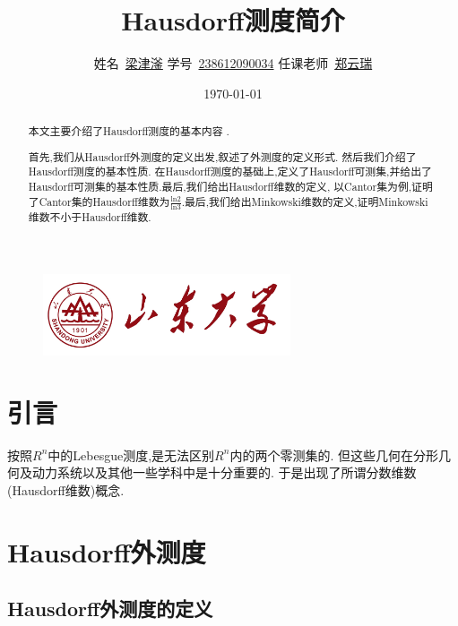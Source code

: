 \documentclass[hyperref,a4paper,UTF8]{ctexart}
\title{\textbf{{Hausdorff测度简介}}}
\author{
\kaishu\normalsize
姓名\ \underline{梁津滏} \qquad
学号\ \underline{238612090034} \qquad
任课老师\ \underline{郑云瑞}
}
\date{\today} %
\begin{document}
\begin{figure}
    \centering
    \includegraphics[width=0.65\textwidth]{figure/SDU.jpg}
\end{figure}

\maketitle

\begin{abstract}

本文主要介绍了Hausdorff测度的基本内容 . 

首先,我们从Hausdorff外测度的定义出发,叙述了外测度的定义形式. 然后我们介绍了Hausdorff测度的基本性质. 在Hausdorff测度的基础上,定义了Hausdorff可测集,并给出了Hausdorff可测集的基本性质.最后,我们给出Hausdorff维数的定义, 以Cantor集为例,证明了Cantor集的Hausdorff维数为$\frac{\mathrm{ln}2}{\mathrm{ln}3}$.最后,我们给出Minkowski维数的定义,证明Minkowski维数不小于Hausdorff维数.

\end{abstract}

\thispagestyle{empty} %
\newpage

\tableofcontents

\thispagestyle{empty} %
\newpage




\section{引言}

按照$R^n$中的Lebesgue测度,是无法区别$R^n$内的两个零测集的.
但这些几何在分形几何及动力系统以及其他一些学科中是十分重要的.
于是出现了所谓分数维数(Hausdorff维数)概念. 

\section{Hausdorff外测度}

\subsection{Hausdorff外测度的定义}
\end{document}
